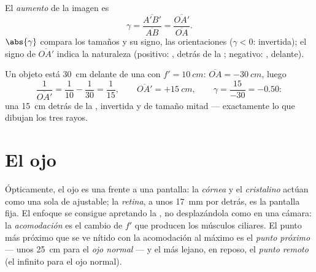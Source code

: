 \begin{definition}[Aumento]\label{def:g11:lenses-and-eye:magnification}
El \emph{aumento} de la imagen es
\[
\gamma = \frac{\overline{A'B'}}{\overline{AB}}
       = \frac{\overline{OA'}}{\overline{OA}} .
\]
$\abs{\gamma}$ compara los tamaños y su signo, las orientaciones
($\gamma < 0$: invertida); el signo de $\overline{OA'}$ indica la
naturaleza (positivo: , detrás de la ; negativo: ,
delante).
\end{definition}

\begin{example}\label{ex:g11:lenses-and-eye:conjugate}
Un objeto está \qty{30}{cm} delante de una  con
$f' = \qty{10}{cm}$: $\overline{OA} = \qty{-30}{cm}$, luego
\[
\frac{1}{\overline{OA'}} = \frac{1}{10} - \frac{1}{30} = \frac{1}{15},
\qquad \overline{OA'} = +\qty{15}{cm},
\qquad \gamma = \frac{15}{-30} = -0.50 :
\]
una  \qty{15}{cm} detrás de la , invertida y de tamaño
mitad --- exactamente lo que dibujan los tres rayos.
\end{example}

\section{El ojo}

\begin{definition}\label{def:g11:lenses-and-eye:eye}
Ópticamente, el ojo es una  frente a una pantalla: la
\emph{córnea} y el \emph{cristalino}
actúan como una sola  de  ajustable; la
\emph{retina}, a unos \qty{17}{mm} por detrás, es la
pantalla fija. El enfoque se consigue apretando la , no
desplazándola como en una cámara: la
\emph{acomodación} es el cambio de $f'$ que producen
los músculos ciliares. El punto más próximo que se ve nítido con la
acomodación al máximo es el \emph{punto próximo}
--- unos \qty{25}{cm} para el \emph{ojo normal} --- y
el más lejano, en reposo, el \emph{punto remoto}
(el infinito para el ojo normal).
\end{definition}

